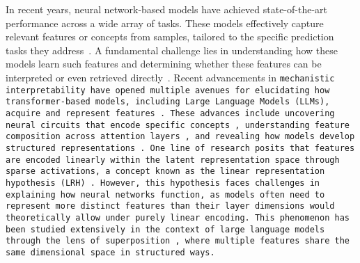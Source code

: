 In recent years, neural network-based models have achieved state-of-the-art performance across a wide array of tasks. These models effectively capture relevant features or concepts from samples, tailored to the specific prediction tasks they address~\citep{yang_feature,Bordelon2022SelfconsistentDF,ba2022highdimensional}. A fundamental challenge lies in understanding how these models learn such features and determining whether these features can be interpreted or even retrieved directly~\citep{rfm}. Recent advancements in \tt{mechanistic interpretability} have opened multiple avenues for elucidating how transformer-based models, including Large Language Models (LLMs), acquire and represent features~\citep{bricken2023monosemanticity, doshivelez2017rigorousscienceinterpretablemachine}. These advances include uncovering neural circuits that encode specific concepts~\citep{marks2024sparsefeaturecircuitsdiscovering,olah2020zoom}, understanding feature composition across attention layers~\citep{yang_feature}, and revealing how models develop structured representations~\citep{elhage2022superposition}.
One line of research posits that features are encoded linearly within the latent representation space through sparse activations, a concept known as the linear representation hypothesis (LRH)~\citep{mikolov-etal-2013-linguistic,arora-etal-2016-latent}. However, this hypothesis faces challenges in explaining how neural networks function, as models often need to represent more distinct features than their layer dimensions would theoretically allow under purely linear encoding. This phenomenon has been studied extensively in the context of large language models through the lens of superposition~\citep{elhage2022superposition}, where multiple features share the same dimensional space in structured ways.
